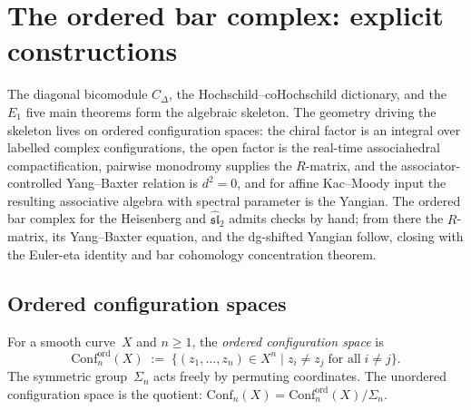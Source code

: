 \section{The ordered bar complex: explicit constructions}
\label{sec:ordered-bar-explicit}

The diagonal bicomodule $C_\Delta$, the Hochschild--coHochschild
dictionary, and the $E_1$ five main theorems form the algebraic
skeleton. The geometry driving the skeleton lives on ordered
configuration spaces: the chiral factor is an integral over labelled
complex configurations, the open factor is the real-time
associahedral compactification, pairwise monodromy supplies the
$R$-matrix, and the associator-controlled Yang--Baxter relation is
$d^2=0$,
and for affine Kac--Moody input the resulting associative algebra
with spectral parameter is the Yangian. The ordered bar complex for
the Heisenberg and $\widehat{\mathfrak{sl}}_2$ admits checks by
hand; from there the $R$-matrix, its Yang--Baxter equation, and the
dg-shifted Yangian follow, closing with the Euler-eta identity and
bar cohomology concentration theorem.

\subsection{Ordered configuration spaces}
\label{subsec:ordered-config-spaces}

\begin{definition}
\label{def:ordered-config-space}
For a smooth curve~$X$ and $n\ge 1$, the \emph{ordered
configuration space} is
\[
\mathrm{Conf}_n^{\mathrm{ord}}(X)
\;:=\;
\bigl\{(z_1,\dots,z_n)\in X^n
\;\big|\;
z_i\neq z_j\;\text{for all}\;i\neq j\bigr\}.
\]
The symmetric group~$\Sigma_n$ acts freely by permuting
coordinates. The unordered configuration space is the
quotient:
$\mathrm{Conf}_n(X)
=\mathrm{Conf}_n^{\mathrm{ord}}(X)/\Sigma_n$.
\end{definition}

